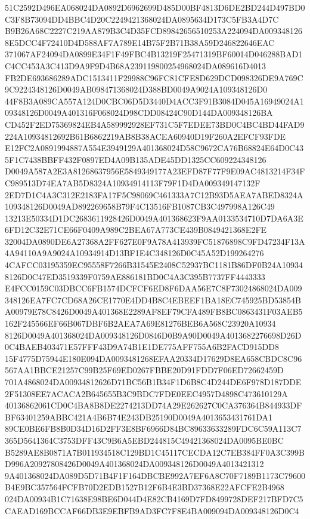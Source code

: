 \documentclass[UTF8,fontset=fandol,zihao=-4,a4paper]{ctexart}
\begin{document}
{{51C2592D496EA068024DA0892D6962699D485D00BF4813D6DE2BD244D497BD0C3F8B73094DD4BBC4D20C2249421368024DA0895634D173C5FB3A4D7C
B9B26A68C2227C219AA879B3C4D35FCD89842656510253A224094DA0093481268E5DCC4F72410D4D588AF7A789E14B75F2B71B38A59D246822646EAC
371067AF24094DA0899E34F1F49FBC4B13219F25471319BF60014D046288BAD1C4CC453A3C413D9A9F9D4B68A239119800254968024DA089616D4013
FB2DE693686289ADC1513411F29988C96FC81CFE8D629DCD098326DE9A769C9C9224348126D0049AB098471368024D388BD0049A9024A109348126D0
44F8B3A089CA557A124D0CBC06D5D3440D4ACC3F91B3084D045A16949024A109348126D0049A401316F068024D98CDD08424C90D144DA009348126BA
CD452F2ED75369824EB4A589992928EF731C5F7EDEE73BD0C4BC4BD44FAD9224A10934812692B61B6862219AB8B38ACEA60940D19F260A2EFCF93FDE
E12FC2A0891994887A554E3949129A401368024D58C9672CA76B68824E64D0C435F1C7438BBFF432F0897ED4A09B135ADE45DD1325CC609224348126
D0049A587A2E3A81268637956E5849349177A23EFD87F77F9E09AC4813214F34FC989513D74EA7AB5D8324A10934914113F79F1D4DA009349147132F
2ED7D1C4A3C312E2183FA17F5C98069C461333A7C12B93D5AEA7ABED8324A109348126D0049AD892269658B79F4C13516FB1087CB3C497998A126C49
13213E50334D1DC2683611928426D0049A401368623F9AA0133534710D7DA6A3E6FD12C32E71CE66F0409A989C2BEA67A773CE439B0849421368E2FE
32004DA0890DE6A27368A2FF627E0F9A78A413939FC51876898C9FD47234F13A4A94110A9A9024A10934914D13BF1E4C348126D0C45A52D199264276
4CAFCC03195359EC95558F7266B31545E2408C52937BC1181B86DF0B24A109348126D0C47ED3519339F0759AE886181BD0C4A3C395B7737FF4443333
E4FCC0159C03DBCC6FB1574DCFCF6ED8F6DAA56E7C8F73024868024DA009348126EA7FC7CD68A26CE1770E4DD4B8C4EBEEF1BA18EC745925BD53854B
A00979E78C8426D0049A401368E2289AF8EF79CFA489FB8BC0863431F03AEB5162F245566EF66B067DBF6B2AEA7A69E81276BEB6A568C23920A10934
8126D0049A401368024DA009348126D0846D0B9A90D0049A4013682276698D26D0C4BAEB403471E57FFF43D9A74B1E1DE775AFF755A6B2FACD915DD8
15F4775D75944E180E094DA0093481268EFAA20334D17629D8EA658CBDC8C96567AA1BBCE21257C99B25F69ED0267FBBE20D91FDD7F06ED72662459D
701A4868024DA00934812626D71BC56B1B34F1D6B8C4D244DE6F978D187DDE2F51308EE7ACACA2B645655B3C9BDC7FDE0EEC4957D4898C473610129A
40136862061CD0C4BA8B8DE2274213DD74A29E262627C0CA376364B844933DFBF63401259ABBC421A4B6B74E243DB25190D0049A4013653431761DA1
89CE0BE6FB8B0D34D16D2FF3E8BF6966D84BC89633633289FDC6C59A113C7365D5641364C3753DFF43C9B6A5EBD244815C49421368024DA0095BE0BC
B5289AE8B0871A7B011934518C129BD1C45117CECDA12C7EB384FF0A3C399BD996A20927808426D0049A401368024DA009348126D0049A4013421312
9A401368024DA089D5D71B4F1F164DBCBE992A7EF6A8C70F7189B1173C79600B4E9BC357564FCFB70D2EDB1527B12F6B4E3BD37368E22AFCFE2B4968
024DA00934B1C71638E98BE6D044D4E82CB4169D7FD8499728DEF217BFD7C5CAEAD169BCCAF66DB3E9EBFB9AD3FC7F8E4BA009094DA009348126D0C4
}}
\end{document}
